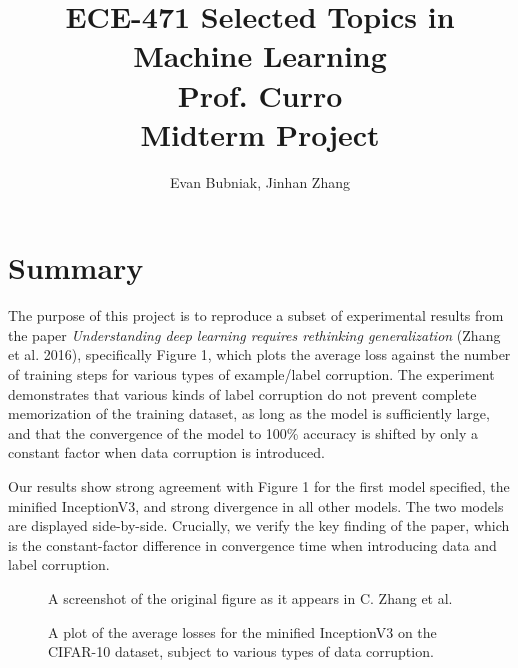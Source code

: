 \documentclass[12pt]{article}
\title{%
	ECE-471 Selected Topics in Machine Learning \\
	Prof. Curro \\
	Midterm Project}
\author{Evan Bubniak, Jinhan Zhang}
\begin{document}
\maketitle

\section{Summary}

The purpose of this project is to reproduce a subset of experimental results from the paper \textit{Understanding deep learning requires rethinking generalization} (Zhang et al. 2016), specifically Figure 1, which plots the average loss against the number of training steps for various types of example/label corruption. The experiment demonstrates that various kinds of label corruption do not prevent complete memorization of the training dataset, as long as the model is sufficiently large, and that the convergence of the model to 100\% accuracy is shifted by only a constant factor when data corruption is introduced.

Our results show strong agreement with Figure 1 for the first model specified, the minified InceptionV3, and strong divergence in all other models. The two models are displayed side-by-side. Crucially, we verify the key finding of the paper, which is the constant-factor difference in convergence time when introducing data and label corruption.

\begin{figure}[H]
	\centering
	\begin{minipage}{.5\textwidth}
		\centering
		\caption{A screenshot of the original figure as it appears in C. Zhang et al.}
		\caption{A plot of the average losses for the minified InceptionV3 on the CIFAR-10 dataset, subject to various types of data corruption.}
	\end{minipage}
\end{figure}
\end{document}
